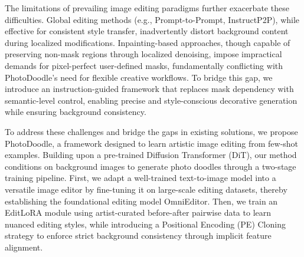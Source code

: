 The limitations of prevailing image editing paradigms further exacerbate these difficulties. Global editing methods (e.g., Prompt-to-Prompt\cite{p2p}, InstructP2P\cite{brooks2023instructpix2pix}), while effective for consistent style transfer, inadvertently distort background content during localized modifications. Inpainting-based approaches, though capable of preserving non-mask regions through localized denoising, impose impractical demands for pixel-perfect user-defined masks, fundamentally conflicting with PhotoDoodle’s need for flexible creative workflows. To bridge this gap, we introduce an instruction-guided framework that replaces mask dependency with semantic-level control, enabling precise and style-conscious decorative generation while ensuring background consistency.


To address these challenges and bridge the gaps in existing solutions, we propose PhotoDoodle, a framework designed to learn artistic image editing from few-shot examples. Building upon a pre-trained Diffusion Transformer (DiT), our method conditions on background images to generate photo doodles through a two-stage training pipeline. First, we adapt a well-trained text-to-image model into a versatile image editor by fine-tuning it on large-scale editing datasets, thereby establishing the foundational editing model OmniEditor. Then, we train an EditLoRA module using artist-curated before-after pairwise data to learn nuanced editing styles, while introducing a Positional Encoding (PE) Cloning strategy to enforce strict background consistency through implicit feature alignment.



